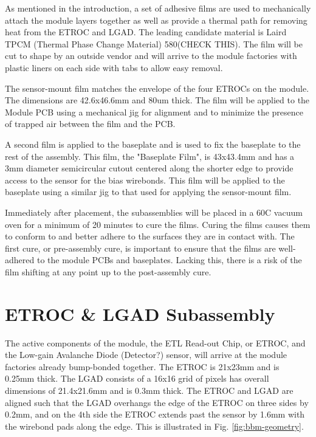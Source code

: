 \documentclass[10pt]{datasheet}
\begin{document}
As mentioned in the introduction, a set of adhesive films are used to mechanically attach the module layers together as well as provide a thermal path for removing heat from the ETROC and LGAD. The leading candidate material is Laird TPCM (Thermal Phase Change Material) 580(CHECK THIS). The film will be cut to shape by an outside vendor and will arrive to the module factories with plastic liners on each side with tabs to allow easy removal.

The sensor-mount film matches the envelope of the four ETROCs on the module. The dimensions are 42.6x46.6mm and 80um thick. The film will be applied to the Module PCB using a mechanical jig for alignment and to minimize the presence of trapped air between the film and the PCB.

A second film is applied to the baseplate and is used to fix the baseplate to the rest of the assembly. This film, the "Baseplate Film", is 43x43.4mm and has a 3mm diameter semicircular cutout centered along the shorter edge to provide access to the sensor for the bias wirebonds. This film will be applied to the baseplate using a similar jig to that used for applying the sensor-mount film. 

Immediately after placement, the subassemblies will be placed in a 60\degree C vacuum oven for a minimum of 20 minutes to cure the films. Curing the films causes them to conform to and better adhere to the surfaces they are in contact with. The first cure, or pre-assembly cure, is important to ensure that the films are well-adhered to the module PCBs and baseplates. Lacking this, there is a risk of the film shifting at any point up to the post-assembly cure.

\section{ETROC \& LGAD Subassembly}

The active components of the module, the ETL Read-out Chip, or ETROC, and the Low-gain Avalanche Diode (Detector?) sensor, will arrive at the module factories already bump-bonded together. The ETROC is 21x23mm and is 0.25mm thick. The LGAD consists of a 16x16 grid of pixels has overall dimensions of 21.4x21.6mm and is 0.3mm thick. The ETROC and LGAD are aligned such that the LGAD overhangs the edge of the ETROC on three sides by 0.2mm, and on the 4th side the ETROC extends past the sensor by 1.6mm with the wirebond pads along the edge. This is illustrated in Fig. \ref{fig:bbm-geometry}.
\end{document}
